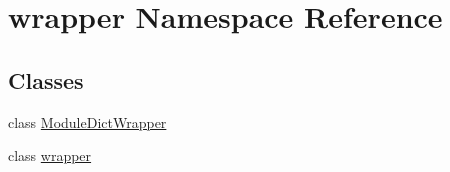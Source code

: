 \hypertarget{namespacewrapper}{}\section{wrapper Namespace Reference}
\label{namespacewrapper}
\subsection*{Classes}
\begin{DoxyCompactItemize}
\item 
class \hyperlink{classwrapper_1_1ModuleDictWrapper}{Module\+Dict\+Wrapper}
\item 
class \hyperlink{classwrapper_1_1wrapper}{wrapper}
\end{DoxyCompactItemize}
